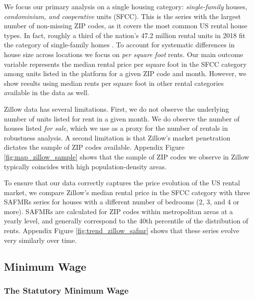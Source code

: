 We focus our primary analysis on a single housing category:
\textit{single-family} houses, \textit{condominium, and cooperative} units (SFCC).
This is the series with the largest number of non-missing ZIP codes, as it 
covers the most common US rental house types.
In fact, roughly a third of the nation's 47.2 million rental units in 2018 fit 
the category of single-family homes \parencite{Fernald2020}.
To account for systematic differences in house size across locations we focus 
on \textit{per square foot} rents.
Our main outcome variable represents the median rental price per square foot in 
the SFCC category among units listed in the platform for a given ZIP code and 
month.
However, we show results using median rents per square foot in other rental 
categories available in the data as well.

Zillow data has several limitations.
First, we do not observe the underlying number of units listed for rent in a 
given month.
We do observe the number of houses listed \textit{for sale}, which we use as a
proxy for the number of rentals in robustness analysis.
A second limitation is that Zillow's market penetration dictates the sample of 
ZIP codes available.
Appendix Figure \ref{fig:map_zillow_sample} shows that the sample of ZIP codes
we observe in Zillow typically coincides with high population-density areas.

To ensure that our data correctly captures the price evolution of the US rental 
market, we compare 
Zillow's median rental price in the SFCC category with 
three SAFMRs series for houses with a different number of bedrooms (2, 3, and 
4 or more).
SAFMRs are calculated for ZIP codes within metropolitan areas at a yearly level, 
and generally correspond to the 40th percentile of the distribution of rents.
Appendix Figure \ref{fig:trend_zillow_safmr} shows that these series evolve
very similarly over time.

\subsection{Minimum Wage}\label{sec:mw_construction}

\subsubsection{The Statutory Minimum Wage}

